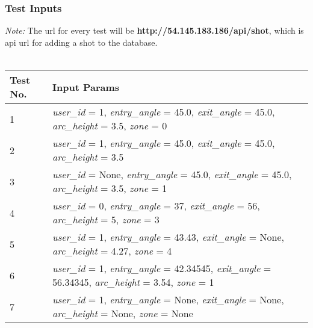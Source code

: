 \subsubsection{Test Inputs} \label{21_in}
\emph{Note:} The url for every test will be \textbf{http://54.145.183.186/api/shot}, which is api url for adding a shot to the database.
\\
\\
\begin{tabular}{| l | l |}
    \hline 
    \textbf{Test No.} & \textbf{Input Params} \\
    \hline
    1                 & \textit{user\_id} = 1, \textit{entry\_angle} = 45.0, \textit{exit\_angle} = 45.0, \textit{arc\_height} = 3.5, \textit{zone} = 0 \\
    \hline 
    2                 & \textit{user\_id} = 1, \textit{entry\_angle} = 45.0, \textit{exit\_angle} = 45.0, \textit{arc\_height} = 3.5 \\
    \hline 
    3                 & \textit{user\_id} = None, \textit{entry\_angle} = 45.0, \textit{exit\_angle} = 45.0, \textit{arc\_height} = 3.5, \textit{zone} = 1 \\
    \hline 
    4                 & \textit{user\_id} = 0, \textit{entry\_angle} = 37, \textit{exit\_angle} = 56, \textit{arc\_height} = 5, \textit{zone} = 3 \\
    \hline 
    5                 & \textit{user\_id} = 1, \textit{entry\_angle} = 43.43, \textit{exit\_angle} = None, \textit{arc\_height} = 4.27, \textit{zone} = 4 \\
    \hline 
    6                 & \textit{user\_id} = 1, \textit{entry\_angle} = 42.34545, \textit{exit\_angle} = 56.34345, \textit{arc\_height} = 3.54, \textit{zone} = 1 \\
    \hline 
    7                 & \textit{user\_id} = 1, \textit{entry\_angle} = None, \textit{exit\_angle} = None, \textit{arc\_height} = None, \textit{zone} = None \\
    \hline 
\end{tabular}

